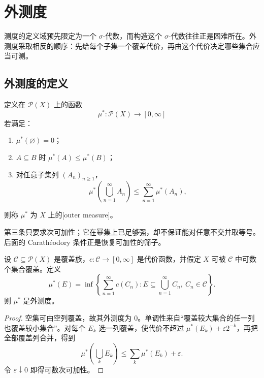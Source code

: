\section{外测度}
\label{b1:sec:0203}

测度的定义域预先限定为一个 \(\sigma\)-代数，而构造这个 \(\sigma\)-代数往往正是困难所在。外测度采取相反的顺序：先给每个子集一个覆盖代价，再由这个代价决定哪些集合应当可测。

\subsection{外测度的定义}
\label{b1:subsec:020301}

\begin{definition}
\label{b1:def:outer-measure}
定义在 \(\mathcal P(X)\) 上的函数
\[
\mu^*:\mathcal P(X)\longrightarrow[0,\infty]
\]
若满足：
\begin{enumerate}
  \item \(\mu^*(\varnothing)=0\)；
  \item \(A\subseteq B\) 时 \(\mu^*(A)\leq\mu^*(B)\)；
  \item 对任意子集列 \((A_n)_{n\geq1}\)，
  \[
  \mu^*\left(\bigcup_{n=1}^{\infty}A_n\right)
  \leq\sum_{n=1}^{\infty}\mu^*(A_n),
  \]
\end{enumerate}
则称 \(\mu^*\) 为 \(X\) 上的[outer measure]。
\end{definition}

第三条只要求次可加性；它在幂集上已足够强，却不保证能对任意不交并取等号。后面的 Carathéodory 条件正是恢复可加性的筛子。

\begin{proposition}
\label{b1:prop:covering-outer-measure}
设 \(\mathcal C\subseteq\mathcal P(X)\) 是覆盖族，\(c:\mathcal C\to[0,\infty]\) 是代价函数，并假定 \(X\) 可被 \(\mathcal C\) 中可数个集合覆盖。定义
\[
\mu^*(E)
=\inf\left\{\sum_{n=1}^{\infty}c(C_n):
E\subseteq\bigcup_{n=1}^{\infty}C_n,\ C_n\in\mathcal C\right\}.
\]
则 \(\mu^*\) 是外测度。
\end{proposition}
\begin{proof}
空集可由空列覆盖，故其外测度为 \(0\)。单调性来自“覆盖较大集合的任一列也覆盖较小集合”。对每个 \(E_k\) 选一列覆盖，使代价不超过 \(\mu^*(E_k)+\varepsilon2^{-k}\)，再把全部覆盖列合并，得到
\[
\mu^*\left(\bigcup_kE_k\right)
\leq\sum_k\mu^*(E_k)+\varepsilon.
\]
令 \(\varepsilon\downarrow0\) 即得可数次可加性。
\end{proof}

